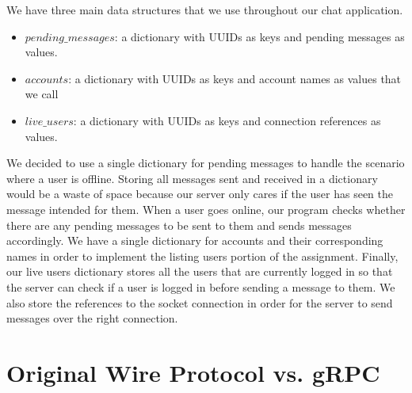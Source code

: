 \documentclass[
	a4paper, %
	10pt, %
	unnumberedsections, %
	twoside, %
]{LTJournalArticle}
\begin{document}
We have three main data structures that we use throughout our chat application. 
\begin{itemize}
    \item $pending\_messages$: a dictionary with UUIDs as keys and pending messages as values. 
    \item $accounts$: a dictionary with UUIDs as keys and account names as values that we call 
    \item $live\_users$: a dictionary with UUIDs as keys and connection references as values. 
\end{itemize}

We decided to use a single dictionary for pending messages to handle the scenario where a user is offline. Storing all messages sent and received in a dictionary would be a waste of space because our server only cares if the user has seen the message intended for them. When a user goes online, our program checks whether there are any pending messages to be sent to them and sends messages accordingly. We have a single dictionary for accounts and their corresponding names in order to implement the listing users portion of the assignment. Finally, our live users dictionary stores all the users that are currently logged in so that the server can check if a user is logged in before sending a message to them. We also store the references to the socket connection in order for the server to send messages over the right connection.

\section{Original Wire Protocol vs. gRPC}
\end{document}
